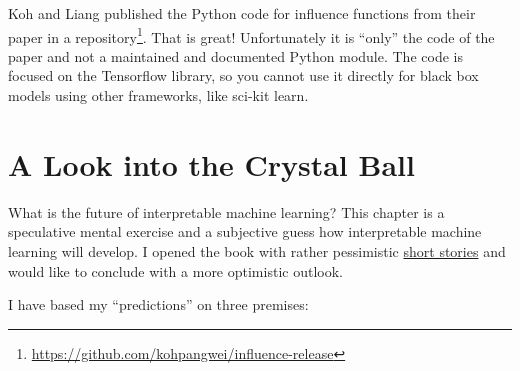 \documentclass[
  11pt,
]{scrbook}
\renewcommand{\href}[2]{#2\footnote{\url{#1}}}
\begin{document}
Koh and Liang published the Python code for influence functions from their paper \href{https://github.com/kohpangwei/influence-release}{in a repository}.
That is great!
Unfortunately it is ``only'' the code of the paper and not a maintained and documented Python module.
The code is focused on the Tensorflow library, so you cannot use it directly for black box models using other frameworks, like sci-kit learn.

\hypertarget{future}{%
\chapter{A Look into the Crystal Ball}\label{future}}

What is the future of interpretable machine learning?
This chapter is a speculative mental exercise and a subjective guess how interpretable machine learning will develop.
I opened the book with rather pessimistic \protect\hyperlink{storytime}{short stories} and would like to conclude with a more optimistic outlook.

I have based my ``predictions'' on three premises:
\end{document}
